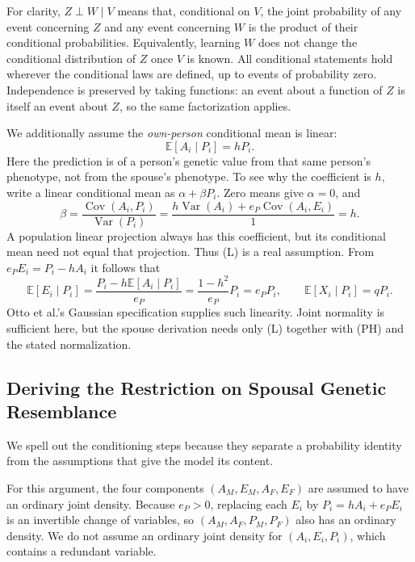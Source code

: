 For clarity, $Z\perp W\mid V$ means that, conditional on $V$, the joint
probability of any event concerning $Z$ and any event concerning $W$
is the product of their conditional probabilities. Equivalently, learning
$W$ does not change the conditional distribution of $Z$ once $V$ is known.
All conditional statements hold wherever the conditional laws are
defined, up to events of probability zero. Independence is preserved by
taking functions: an event about a function of $Z$ is itself an event
about $Z$, so the same factorization applies.

We additionally assume the \emph{own-person} conditional mean is linear:
\begin{equation}
 \mathbb E[A_i\mid P_i]=hP_i.
 \tag{L}\label{eq:model-linearity}
\end{equation}
Here the prediction is of a person's genetic value from that same person's
phenotype, not from the spouse's phenotype. To see why the coefficient is
$h$, write a linear conditional mean as $\alpha+\beta P_i$. Zero means give
$\alpha=0$, and
\[
 \beta=\frac{\operatorname{Cov}(A_i,P_i)}{\operatorname{Var}(P_i)}
 =\frac{h\operatorname{Var}(A_i)+e_P\operatorname{Cov}(A_i,E_i)}{1}=h.
\]
A population linear projection always has this coefficient, but its
conditional mean need not equal that projection. Thus (L) is a real
assumption. From $e_P E_i=P_i-hA_i$ it follows that
\[
 \mathbb E[E_i\mid P_i]
 =\frac{P_i-h\mathbb E[A_i\mid P_i]}{e_P}
 =\frac{1-h^2}{e_P}P_i=e_P P_i,\qquad
 \mathbb E[X_i\mid P_i]=qP_i.
\]
Otto et al.'s Gaussian specification supplies such linearity. Joint
normality is sufficient here, but the spouse derivation needs only (L)
together with (PH) and the stated normalization.

\subsection{Deriving the Restriction on Spousal Genetic Resemblance}
\label{sec:model-spouses}

We spell out the conditioning steps because they separate a probability
identity from the assumptions that give the model its content.

For this argument, the four components $(A_M,E_M,A_F,E_F)$ are assumed
to have an ordinary joint density.
Because $e_P>0$, replacing each $E_i$ by $P_i=hA_i+e_P E_i$ is an invertible
change of variables, so $(A_M,A_F,P_M,P_F)$ also has an ordinary density.
We do not assume an ordinary joint density for $(A_i,E_i,P_i)$, which
contains a redundant variable.


